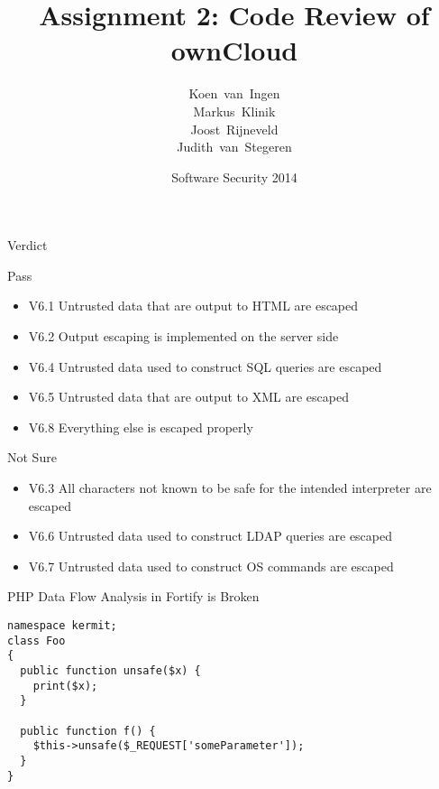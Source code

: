 \documentclass{beamer}
\title
{Assignment 2: Code Review of ownCloud}
\author
{
Koen~van~Ingen\\
Markus~Klinik\\
Joost~Rijneveld\\
Judith~van~Stegeren\\
}
\institute[Radboud University Nijmegen]
{
  Radboud University Nijmegen
}
\date
{Software Security 2014}
\begin{document}
\begin{frame}
  \titlepage
\end{frame}


\begin{frame}{Verdict}
\fontsize{8}{12.0}\selectfont


Pass
\begin{itemize}
\item V6.1 Untrusted data that are output to HTML are escaped
\item V6.2 Output escaping is implemented on the server side
\item V6.4 Untrusted data used to construct SQL queries are escaped
\item V6.5 Untrusted data that are output to XML are escaped
\item V6.8 Everything else is escaped properly
\end{itemize}

\medskip
Not Sure
\begin{itemize}
\item V6.3 All characters not known to be safe for the intended interpreter are escaped
\item V6.6 Untrusted data used to construct LDAP queries are escaped
\item V6.7 Untrusted data used to construct OS commands are escaped
\end{itemize}

\end{frame}


\begin{frame}[fragile]{PHP Data Flow Analysis in Fortify is Broken}


\begin{verbatim}
namespace kermit;
class Foo
{
  public function unsafe($x) {
    print($x);
  }

  public function f() {
    $this->unsafe($_REQUEST['someParameter']);
  }
}
\end{verbatim}

\end{frame}
\end{document}
